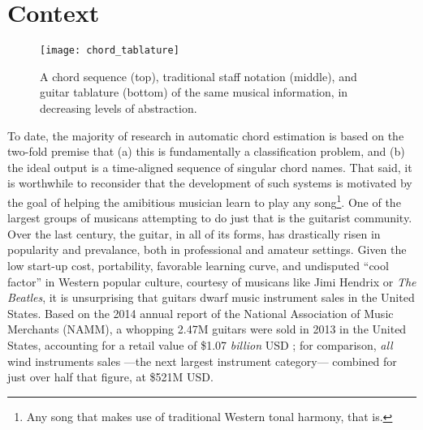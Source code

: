 \section{Context}
\label{sec:context}


\begin{figure}[t!]

  \centering
  \centerline{\texttt{[image: chord\_tablature]}}
\caption{A chord sequence (top), traditional staff notation (middle), and guitar tablature (bottom) of the same musical information, in decreasing levels of abstraction.}
\label{fig:chord_notation}
%
\end{figure}

To date, the majority of research in automatic chord estimation is based on the two-fold premise that (a) this is fundamentally a classification problem, and (b) the ideal output is a time-aligned sequence of singular chord names.
That said, it is worthwhile to reconsider that the development of such systems is motivated by the goal of helping the amibitious musician learn to play any song\footnote{Any song that makes use of traditional Western tonal harmony, that is.}.
One of the largest groups of musicans attempting to do just that is the guitarist community.
Over the last century, the guitar, in all of its forms, has drastically risen in popularity and prevalance, both in professional and amateur settings.
Given the low start-up cost, portability, favorable learning curve, and undisputed ``cool factor'' in Western popular culture, courtesy of musicans like Jimi Hendrix or \emph{The Beatles}, it is unsurprising that guitars dwarf music instrument sales in the United States.
Based on the 2014 annual report of the National Association of Music Merchants (NAMM), a whopping 2.47M guitars were sold in 2013 in the United States, accounting for a retail value of \$1.07 \emph{billion} USD \cite{NAMM2014}; for comparison, \emph{all} wind instruments sales ---the next largest instrument category--- combined for just over half that figure, at \$521M USD.

